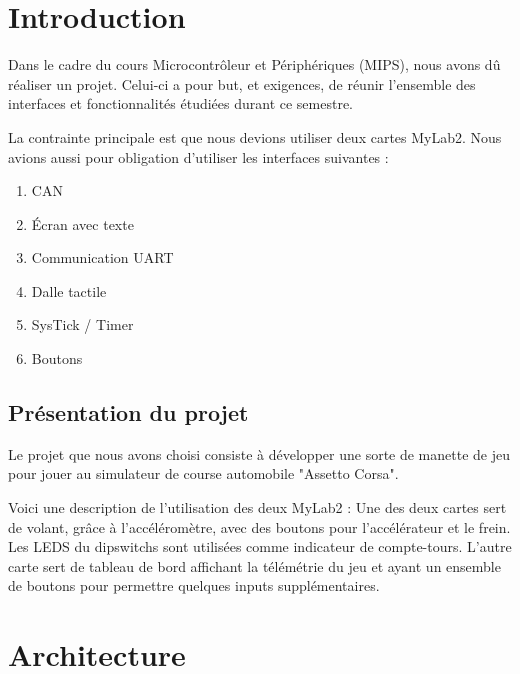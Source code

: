 \documentclass[french, 11pt]{article}
\newcommand{\blankpage}
{
	\null
	\thispagestyle{empty}
	\addtocounter{page}{-1}
	\newpage
}
\begin{document}
\begin{titlepage}
\begin{minipage}{0.53\textwidth}
		\end{minipage}
	
	\end{titlepage}
	
	\blankpage

    \section{Introduction}

    Dans le cadre du cours Microcontrôleur et Périphériques (MIPS), nous avons dû réaliser un projet. Celui-ci a pour but, et exigences, de réunir l'ensemble des interfaces et fonctionnalités étudiées durant ce semestre.

    La contrainte principale est que nous devions utiliser deux cartes MyLab2. Nous avions aussi pour obligation d'utiliser les interfaces suivantes :

    \begin{enumerate}
        \item CAN
        \item Écran avec texte
        \item Communication UART
        \item Dalle tactile
        \item SysTick / Timer
        \item Boutons
    \end{enumerate}

    \subsection{Présentation du projet}

    Le projet que nous avons choisi consiste à développer une sorte de manette de jeu pour jouer au simulateur de course automobile "Assetto Corsa". 
	
	Voici une description de l'utilisation des deux MyLab2 : 
	Une des deux cartes sert de volant, grâce à l'accéléromètre, avec des boutons pour l'accélérateur et le frein. Les LEDS du dipswitchs sont utilisées comme indicateur de compte-tours. L'autre carte sert de tableau de bord affichant la télémétrie du jeu et ayant un ensemble de boutons pour permettre quelques inputs supplémentaires.


    \section{Architecture}
\end{document}
